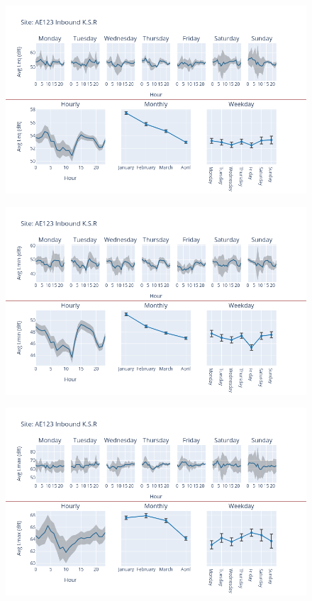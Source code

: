 \documentclass[12pt, oneside]{book}
\begin{document}
{ 
{\begin{figure}[H] 
 \centering 
\includegraphics[width=.88\textwidth, keepaspectratio]{image35} 
 \end{figure}}{} 

{\begin{figure}[H] 
 \centering 
\includegraphics[width=.88\textwidth, keepaspectratio]{image36} 
 \end{figure}}{} 

{\begin{figure}[H] 
 \centering 
\includegraphics[width=.88\textwidth, keepaspectratio]{image37} 
 \end{figure}}{} 
 

}
\end{document}
